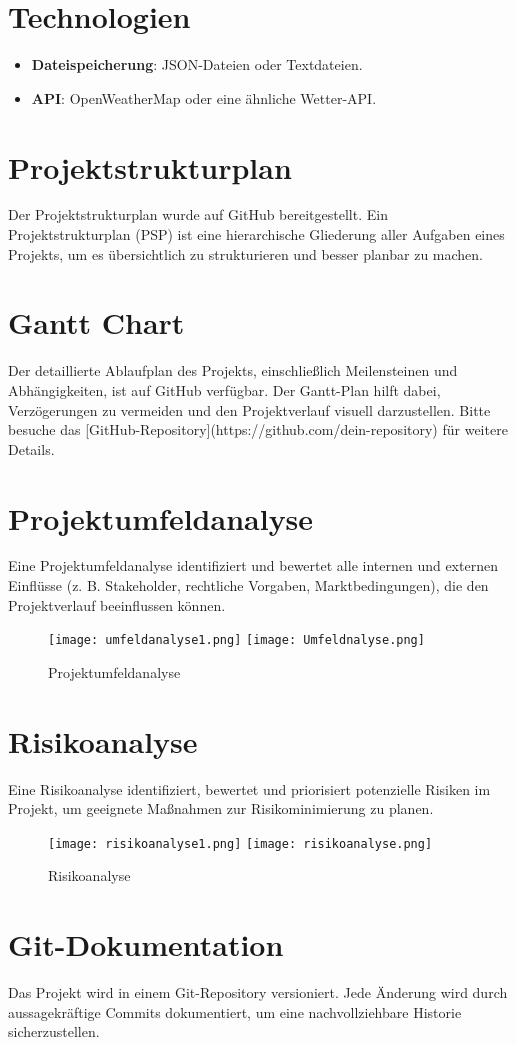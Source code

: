 \documentclass[a4paper,12pt]{article}
\begin{document}
\section{Technologien}
\begin{itemize}
    \item \textbf{Dateispeicherung}: JSON-Dateien oder Textdateien.
    \item \textbf{API}: OpenWeatherMap oder eine ähnliche Wetter-API.
\end{itemize}

\section{Projektstrukturplan}
Der Projektstrukturplan wurde auf GitHub bereitgestellt.
Ein Projektstrukturplan (PSP) ist eine hierarchische Gliederung aller Aufgaben eines Projekts, um es übersichtlich zu strukturieren und besser planbar zu machen.


\section{Gantt Chart}
Der detaillierte Ablaufplan des Projekts, einschließlich Meilensteinen und Abhängigkeiten, ist auf GitHub verfügbar. Der Gantt-Plan hilft dabei, Verzögerungen zu vermeiden und den Projektverlauf visuell darzustellen. Bitte besuche das [GitHub-Repository](https://github.com/dein-repository) für weitere Details.

\section{Projektumfeldanalyse}
Eine Projektumfeldanalyse identifiziert und bewertet alle internen und externen Einflüsse (z. B. Stakeholder, rechtliche Vorgaben, Marktbedingungen), die den Projektverlauf beeinflussen können.

\begin{figure}[h]
    \centering
    \texttt{[image: umfeldanalyse1.png]}
    \texttt{[image: Umfeldnalyse.png]}
    \caption{Projektumfeldanalyse}
    \label{fig:projektumfeldanalyse}
\end{figure}

\section{Risikoanalyse}
Eine Risikoanalyse identifiziert, bewertet und priorisiert potenzielle Risiken im Projekt, um geeignete Maßnahmen zur Risikominimierung zu planen.
\begin{figure}[h]
    \centering
    \texttt{[image: risikoanalyse1.png]}
    \texttt{[image: risikoanalyse.png]}
    \caption{Risikoanalyse}
    \label{fig:risikoanalyse}
\end{figure}

\section{Git-Dokumentation}
Das Projekt wird in einem Git-Repository versioniert. Jede Änderung wird durch aussagekräftige Commits dokumentiert, um eine nachvollziehbare Historie sicherzustellen.
\end{document}
